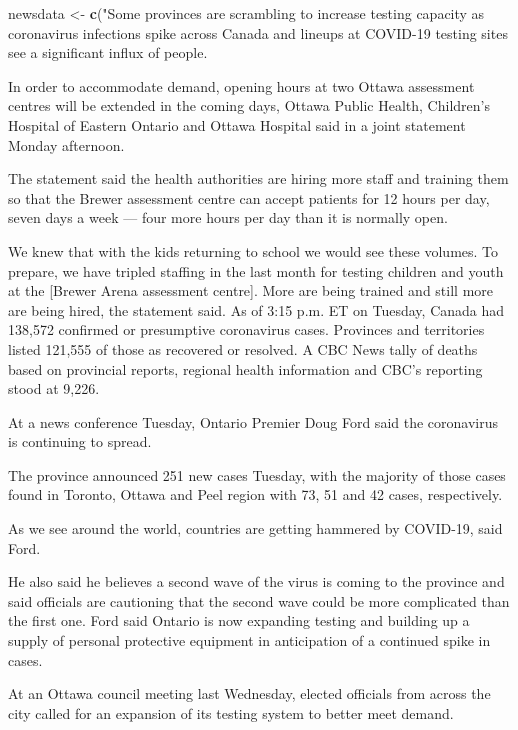 \documentclass[]{article}
\newenvironment{Shaded}{\begin{snugshade}}{\end{snugshade}}
\newcommand{\KeywordTok}[1]{\textcolor[rgb]{0.13,0.29,0.53}{\textbf{#1}}}
\newcommand{\NormalTok}[1]{#1}
\newcommand{\StringTok}[1]{\textcolor[rgb]{0.31,0.60,0.02}{#1}}
\begin{document}
\begin{Shaded}
\begin{Highlighting}[]
\NormalTok{newsdata <-}\StringTok{ }\KeywordTok{c}\NormalTok{(}\StringTok{"Some provinces are scrambling to increase testing capacity as coronavirus infections spike across Canada and lineups at COVID-19 testing sites see a significant influx of people. }

\StringTok{In order to accommodate demand, opening hours at two Ottawa assessment centres will be extended in the coming days, Ottawa Public Health, Children's Hospital of Eastern Ontario and Ottawa Hospital said in a joint statement Monday afternoon. }

\StringTok{The statement said the health authorities are hiring more staff and training them so that the Brewer assessment centre can accept patients for 12 hours per day, seven days a week — four more hours per day than it is normally open.}

\StringTok{We knew that with the kids returning to school we would see these volumes. To prepare, we have tripled staffing in the last month for testing children and youth at the [Brewer Arena assessment centre]. More are being trained and still more are being hired, the statement said. As of 3:15 p.m. ET on Tuesday, Canada had 138,572 confirmed or presumptive coronavirus cases. Provinces and territories listed 121,555 of those as recovered or resolved. A CBC News tally of deaths based on provincial reports, regional health information and CBC's reporting stood at 9,226.}

\StringTok{At a news conference Tuesday, Ontario Premier Doug Ford said the coronavirus is continuing to spread.}

\StringTok{The province announced 251 new cases Tuesday, with the majority of those cases found in Toronto, Ottawa and Peel region with 73, 51 and 42 cases, respectively. }

\StringTok{As we see around the world, countries are getting hammered by COVID-19, said Ford.}

\StringTok{He also said he believes a second wave of the virus is coming to the province and said officials are cautioning that the second wave could be more complicated than the first one. Ford said Ontario is now expanding testing and building up a supply of personal protective equipment in anticipation of a continued spike in cases. }

\StringTok{At an Ottawa council meeting last Wednesday, elected officials from across the city called for an expansion of its testing system to better meet demand.}


\end{Highlighting}
\end{Shaded}
\end{document}
